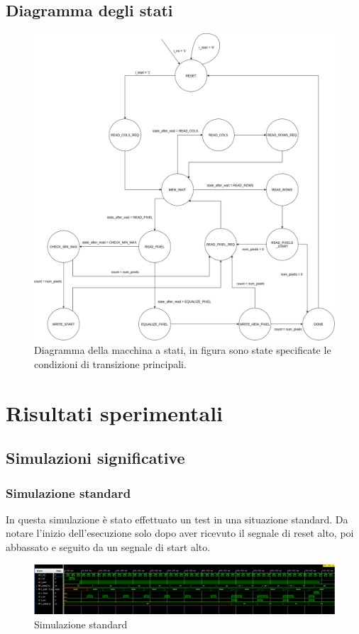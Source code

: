 \documentclass{article}
\begin{document}
\subsection{Diagramma degli stati}
\begin{figure}[h]
    \includegraphics[width=\textwidth]{diagram.png}
    \centering
    \caption{Diagramma della macchina a stati, in figura sono state specificate le condizioni di transizione principali.}
\end{figure}

\pagebreak

\section{Risultati sperimentali}
\subsection{Simulazioni significative}
\subsubsection{Simulazione standard}
In questa simulazione è stato effettuato un test in una situazione standard. Da notare l'inizio dell'esecuzione solo dopo aver ricevuto il segnale di reset alto, poi abbassato e seguito da un segnale di start alto.
\begin{figure}[h]
    \includegraphics[width=\textwidth]{test-standard.png}
    \centering
    \caption{Simulazione standard}
\end{figure}
\end{document}
